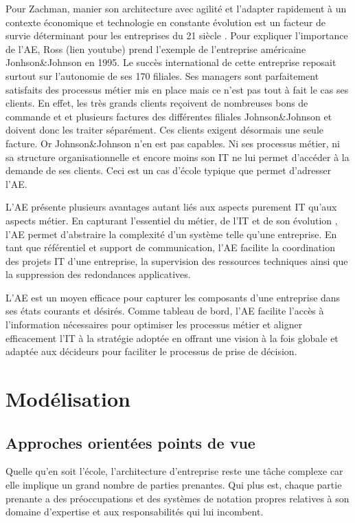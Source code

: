 Pour Zachman, manier son architecture avec agilité et l'adapter rapidement à un contexte économique et technologie en constante évolution est un facteur de survie déterminant pour les entreprises du 21 siècle \cite{zachman1997enterprise}.  Pour expliquer l'importance de l'AE, Ross (lien youtube) prend l'exemple de l'entreprise américaine Jonhson\&Johnson en 1995. Le succès international de cette entreprise reposait surtout sur l'autonomie de ses 170 filiales. Ses managers sont parfaitement satisfaits des processus métier mis en place mais ce n'est pas tout à fait le cas ses clients. En effet, les très grands clients reçoivent de nombreuses bons de commande et et plusieurs factures des différentes filiales Johnson\&Johnson et doivent donc les traiter séparément. Ces clients exigent désormais une seule facture. Or Johnson\&Johnson n'en est pas capables. Ni ses processus métier, ni sa structure organisationnelle et encore moins son IT ne lui permet d'accéder à la demande de ses clients. Ceci est un cas d'école typique que permet d'adresser l'AE.

L'AE présente plusieurs avantages autant liés aux aspects purement IT qu'aux aspects métier. En capturant l'essentiel du métier, de l'IT et de son évolution \cite{lankhorst2013enterprise}, l'AE permet d'abstraire la complexité d'un système telle qu'une entreprise. En tant que référentiel et support de communication, l'AE facilite la coordination des projets IT d'une entreprise, la supervision des ressources techniques ainsi que la suppression des redondances applicatives\cite{shah2007frameworks}.

L'AE est un moyen efficace pour capturer les composants d'une entreprise dans ses états courants et désirés. Comme tableau de bord, l'AE facilite l'accès à l'information nécessaires pour optimiser les processus métier et aligner efficacement l'IT à la stratégie adoptée en offrant une vision à la fois globale et adaptée aux décideurs pour faciliter le processus de prise de décision. 

\section{Modélisation}

	\subsection{Approches orientées points de vue}

Quelle qu'en soit l'école, l'architecture d'entreprise reste une tâche complexe 
\cite{steen2004supporting} car elle implique un grand nombre de parties prenantes. Qui plus est, chaque partie prenante a des préoccupations et des systèmes de notation propres relatives à son domaine d'expertise et aux responsabilités qui lui incombent.

